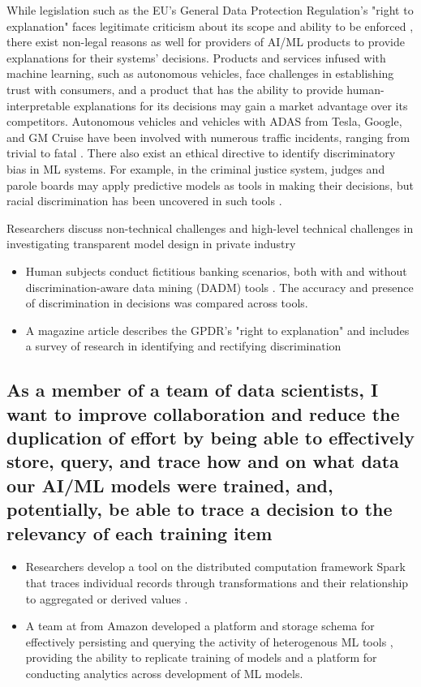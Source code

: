 While legislation such as the EU's General Data Protection Regulation's "right to explanation" faces legitimate criticism about its scope and ability to be enforced \cite{10.1093/idpl/ipx005}, there exist non-legal reasons as well for providers of AI/ML products to provide explanations for their systems' decisions.  Products and services infused with machine learning, such as autonomous vehicles, face challenges in establishing trust with consumers, and a product that has the ability to provide human-interpretable explanations for its decisions may gain a market advantage over its competitors.  Autonomous vehicles and vehicles with ADAS from Tesla, Google, and GM Cruise have been involved with numerous traffic incidents, ranging from trivial to fatal \cite{Read2016} \cite{Tesla2018} \cite{Ackerman2016} \cite{Bhavsar2017}.  There also exist an ethical directive to identify discriminatory bias in ML systems.  For example, in the criminal justice system, judges and parole boards may apply predictive models as tools in making their decisions, but racial discrimination has been uncovered in such tools \cite{Wexler.2017} \cite{Angwin2016}.

Researchers discuss non-technical challenges and high-level technical challenges in investigating transparent model design in private industry \cite{Veale:2018:FAD:3173574.3174014}

\begin{itemize}
    \item Human subjects conduct fictitious banking scenarios, both with and without discrimination-aware data mining (DADM) tools \cite{Berendt2014}.  The accuracy and presence of discrimination in decisions was compared across tools.

    \item A magazine article describes the GPDR's "right to explanation" and includes a survey of research in identifying and rectifying discrimination \cite{Goodman2017EuropeanUR}
\end{itemize}

\subsection{As a member of a team of data scientists, I want to improve collaboration and reduce the duplication of effort by being able to effectively store, query, and trace how and on what data our  AI/ML models were trained, and, potentially, be able to trace a decision to the relevancy of each training item}

\begin{itemize}
    \item Researchers develop a tool on the distributed computation framework Spark that traces individual records through transformations and their relationship to aggregated or derived values  \cite{Interlandi2017}.
    \item A team at from Amazon developed a platform and storage schema for effectively persisting and querying the activity of heterogenous ML tools \cite{Schelter2017}, providing the ability to replicate training of models and a platform for conducting analytics across development of ML models.
\end{itemize}
